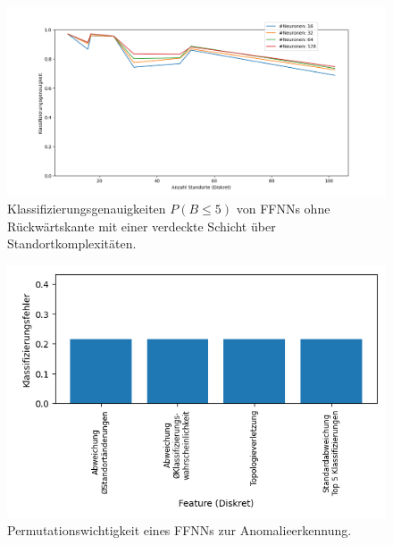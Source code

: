 \begin{figure}[h!]
    \centering
    \includegraphics[width=\linewidth]{images/multiple_best_by_group_knn_neurons_acc_5.png}
    \caption{Klassifizierungsgenauigkeiten $P(B\leq5)$ von FFNNs ohne Rückwärtskante mit einer verdeckte Schicht über Standortkomplexitäten.}
    \label{fig:multiple_best_by_group_knn_neurons_acc_5}
\end{figure}

\begin{figure}[h!]
    \centering
    \includegraphics[width=\linewidth]{images/fi_knn_anomaly.png}
    \caption{Permutationswichtigkeit eines FFNNs zur Anomalieerkennung.}
    \label{fig:fi_knn_anomaly}
\end{figure}